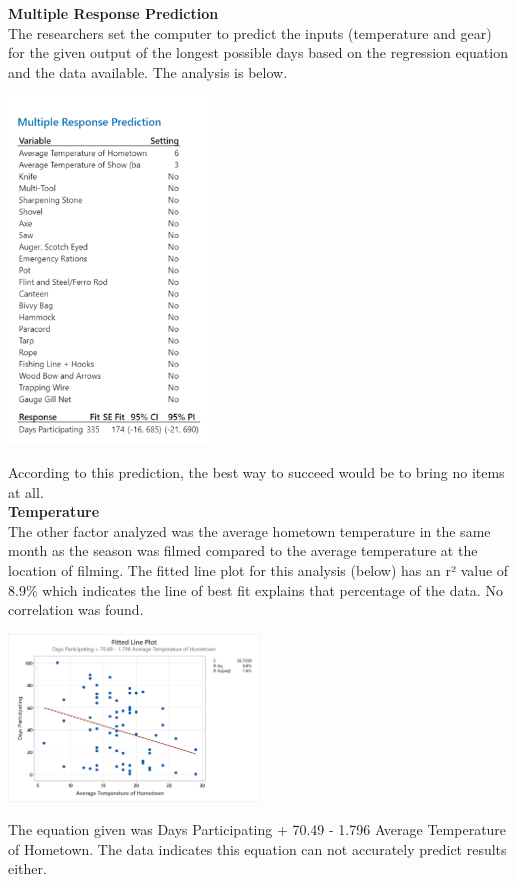 \documentclass[letterpaper,twoside,11pt,twocolumn]{article}
\begin{document}
\noindent\textbf{Multiple Response Prediction}\\
The researchers set the computer to predict the inputs (temperature and gear) for the given output of the longest possible days based on the regression equation and the data available. The analysis is below.

\noindent\includegraphics[width=0.4\textwidth]{./img6.png}

According to this prediction, the best way to succeed would be to bring no items at all.\\

\noindent\textbf{Temperature}\\
The other factor analyzed was the average hometown temperature in the same month as the season was filmed compared to the average temperature at the location of filming. The fitted line plot for this analysis (below) has an r² value of 8.9\% which indicates the line of best fit explains that percentage of the data. No correlation was found. 

\noindent\includegraphics[width=0.5\textwidth]{./img7.png}

The equation given was Days Participating + 70.49 - 1.796 Average Temperature of Hometown. The data indicates this equation can not accurately predict results either. 
\end{document}
